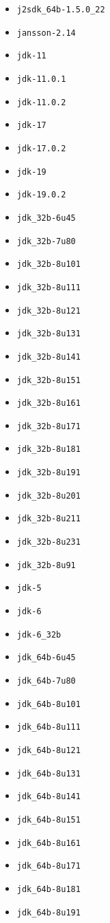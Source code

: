 \begin{multicols}{3}
\begin{itemize}
\item \verb|j2sdk_64b-1.5.0_22|
\item \verb|jansson-2.14|
\item \verb|jdk-11|
\item \verb|jdk-11.0.1|
\item \verb|jdk-11.0.2|
\item \verb|jdk-17|
\item \verb|jdk-17.0.2|
\item \verb|jdk-19|
\item \verb|jdk-19.0.2|
\item \verb|jdk_32b-6u45|
\item \verb|jdk_32b-7u80|
\item \verb|jdk_32b-8u101|
\item \verb|jdk_32b-8u111|
\item \verb|jdk_32b-8u121|
\item \verb|jdk_32b-8u131|
\item \verb|jdk_32b-8u141|
\item \verb|jdk_32b-8u151|
\item \verb|jdk_32b-8u161|
\item \verb|jdk_32b-8u171|
\item \verb|jdk_32b-8u181|
\item \verb|jdk_32b-8u191|
\item \verb|jdk_32b-8u201|
\item \verb|jdk_32b-8u211|
\item \verb|jdk_32b-8u231|
\item \verb|jdk_32b-8u91|
\item \verb|jdk-5|
\item \verb|jdk-6|
\item \verb|jdk-6_32b|
\item \verb|jdk_64b-6u45|
\item \verb|jdk_64b-7u80|
\item \verb|jdk_64b-8u101|
\item \verb|jdk_64b-8u111|
\item \verb|jdk_64b-8u121|
\item \verb|jdk_64b-8u131|
\item \verb|jdk_64b-8u141|
\item \verb|jdk_64b-8u151|
\item \verb|jdk_64b-8u161|
\item \verb|jdk_64b-8u171|
\item \verb|jdk_64b-8u181|
\item \verb|jdk_64b-8u191|

\end{itemize}
\end{multicols}
